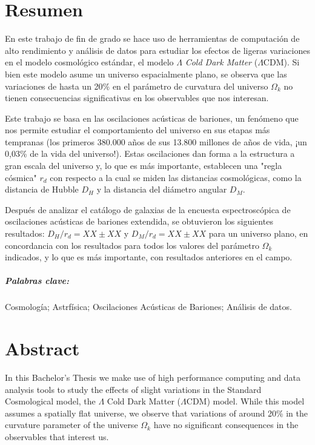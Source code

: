 \chapter*{Resumen}

En este trabajo de fin de grado se hace uso de herramientas de computación de alto rendimiento y análisis de datos para estudiar los efectos de ligeras variaciones en el modelo cosmológico estándar, el modelo $\Lambda$ \textit{Cold Dark Matter} ($\Lambda$CDM). Si bien este modelo asume un universo espacialmente plano, se observa que las variaciones de hasta un 20\% en el parámetro de curvatura del universo $\Omega_k$ no tienen consecuencias significativas en los observables que nos interesan.

Este trabajo se basa en las oscilaciones acústicas de bariones, un fenómeno que nos permite estudiar el comportamiento del universo en sus etapas más tempranas (los primeros 380.000 años de sus 13.800 millones de años de vida, ¡un 0,03\% de la vida del universo!). Estas oscilaciones dan forma a la estructura a gran escala del universo y, lo que es más importante, establecen una "regla cósmica" $r_d$ con respecto a la cual se miden las distancias cosmológicas, como la distancia de Hubble $D_H$ y la distancia del diámetro angular $D_M$.

Después de analizar el catálogo de galaxias de la encuesta espectroscópica de oscilaciones acústicas de bariones extendida, se obtuvieron los siguientes resultados: $D_H/r_d = XX\pm XX$ y $D_M/r_d = XX\pm XX$ para un universo plano, en concordancia con los resultados para todos los valores del parámetro $\Omega_k$ indicados, y lo que es más importante, con resultados anteriores en el campo.

\paragraph{Palabras clave:} Cosmología; Astrfísica; Oscilaciones Acústicas de Bariones; Análisis de datos.









\chapter*{Abstract}

In this Bachelor's Thesis we make use of high performance computing and data analysis tools to study the effects of slight variations in the Standard Cosmological model, the $\Lambda$ Cold Dark Matter ($\Lambda$CDM) model. While this model assumes a spatially flat universe, we observe that variations of around 20\% in the curvature parameter of the universe $\Omega_k$ have no significant consequences in the observables that interest us.\\

